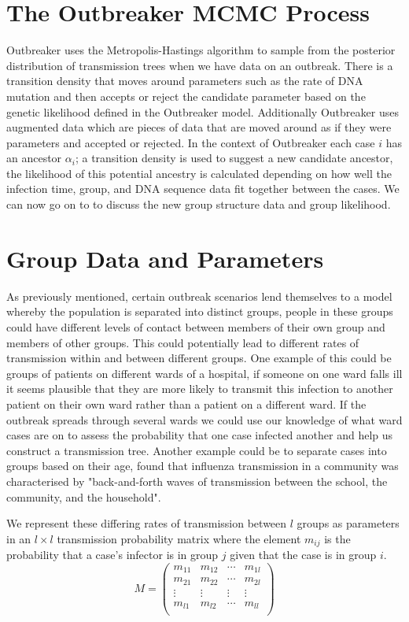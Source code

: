 \documentclass[11pt,a4paper]{report}
\begin{document}
\section{The Outbreaker MCMC Process}
Outbreaker uses the Metropolis-Hastings algorithm to sample from the posterior distribution of transmission trees when we have data on an outbreak. There is a transition density that moves around parameters such as the rate of DNA mutation and then accepts or reject the candidate parameter based on the genetic likelihood defined in the Outbreaker model. Additionally Outbreaker uses augmented data which are pieces of data that are moved around as if they were parameters and accepted or rejected. In the context of Outbreaker each case $i$ has an ancestor $\alpha_i$; a transition density is used to suggest a new candidate ancestor, the likelihood of this potential ancestry is calculated depending on how well the infection time, group, and DNA sequence data fit together between the cases. We can now go on to to discuss the new group structure data and group likelihood.



\section{Group Data and Parameters}
As previously mentioned, certain outbreak scenarios lend themselves to a model whereby the population is separated into distinct groups, people in these groups could have different levels of contact between members of their own group and members of other groups. This could potentially lead to different rates of transmission within and between different groups. One example of this could be groups of patients on different wards of a hospital, if someone on one ward falls ill it seems plausible that they are more likely to transmit this infection to another patient on their own ward rather than a patient on a different ward. If the outbreak spreads through several wards we could use our knowledge of what ward cases are on to assess the probability that one case infected another and help us construct a transmission tree. Another example could be to separate cases into groups based on their age, \citet{Cauchemez11} found that influenza transmission in a community was characterised by "back-and-forth waves of transmission between the school, the community, and the household".


We represent these differing rates of transmission between $l$ groups as parameters in an $l \times l$ transmission probability matrix where the element $m_{ij}$ is the probability that a case's infector is in group $j$ given that the case is in group $i$.
\[ M = \left( \begin{array}{cccc}
m_{11} & m_{12} & \cdots & m_{1l} \\
m_{21} & m_{22} & \cdots & m_{2l} \\
\vdots & \vdots & \vdots & \vdots \\
m_{l1} & m_{l2} & \cdots & m_{ll} \\
\end{array} \right) \] 
\end{document}
